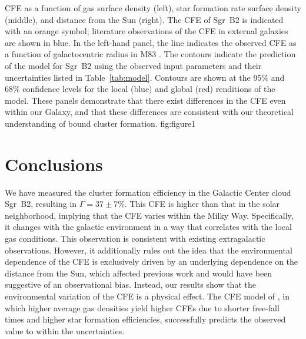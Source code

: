 \documentclass[twocolumn]{aastex62}
\begin{document}
{CFE as a function of gas surface density (left), star formation rate surface
density (middle), and distance from the Sun (right). The CFE of Sgr~B2 is
indicated with an orange symbol; literature observations of the CFE in
external galaxies are shown in blue. In the left-hand panel, the line indicates
the observed CFE as a function of galactocentric radius in M83
\citep{Adamo2015a}. The contours indicate the prediction of the
\citet{Kruijssen2012a} model for Sgr~B2 using the observed input parameters and
their uncertainties listed in Table~\ref{tab:model}. Contours are shown at the
95\% and 68\% confidence levels for the local (blue) and global (red)
renditions of the model. These panels demonstrate that there exist differences
in the CFE even within our Galaxy, and that these differences are consistent
with our theoretical understanding of bound cluster formation. 
}
{fig:figure}{1}{\textwidth}

\section{Conclusions}
We have measured the cluster formation efficiency in the Galactic Center cloud
Sgr~B2, resulting in $\Gamma=37\pm7\%$. This CFE is higher than that in the solar
neighborhood, implying that the CFE varies within the Milky Way. Specifically,
it changes with the galactic environment in a way that correlates with the
local gas conditions. This observation is consistent with existing extragalactic
observations.  However, it additionally rules out the idea that the
environmental dependence of the CFE is exclusively driven by an underlying
dependence on the distance from the Sun, which affected previous work and would have
been suggestive of an observational bias.  Instead, our results show that the
environmental variation of the CFE is a physical effect. The CFE model of
\citet{Kruijssen2012a}, in which higher average gas densities yield higher CFEs
due to shorter free-fall times and higher star formation efficiencies,
successfully predicts the observed value to within the uncertainties.


\end{document}
